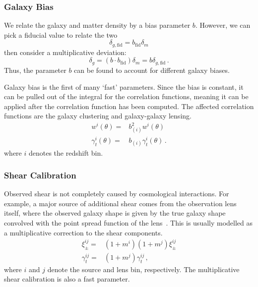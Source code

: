 \subsubsection{Galaxy Bias}
We relate the galaxy and matter density by a bias parameter $b$. However, we can pick a fiducial value to relate the two
\begin{equation}
	\delta_{g,\text{fid}} = b_{\text{fid}}\delta_m
\end{equation}
then consider a multiplicative deviation:
\begin{equation}
	\delta_g = (b\cdot b_{\text{fid}})\delta_m = b\delta_{g,\text{fid}}\,.
\end{equation}
Thus, the parameter $b$ can be found to account for different galaxy biases. 

Galaxy bias is the first of many `fast' parameters. Since the bias is constant, it can be pulled out of the integral for the correlation functions, meaning it can be applied after the correlation function has been computed. The affected correlation functions are the galaxy clustering and galaxy-galaxy lensing.
\begin{equation}
	\begin{split}
		w^i(\theta) =& b_{(i)}^2w^i(\theta) \\
		\gamma^i_t(\theta) =& b_{(i)}\gamma_t^i(\theta)\,.
	\end{split}
\end{equation}
where $i$ denotes the redshift bin.
\subsubsection{Shear Calibration}
Observed shear is not completely caused by cosmological interactions. For example, a major source of additional shear comes from the observation lens itself, where the observed galaxy shape is given by the true galaxy shape convolved with the point spread function of the lens~\cite{hirata_shear_2003,gillis_effects_2019}. This is usually modelled as a multiplicative correction to the shear components.
\begin{equation}
	\begin{split}
		\xi^{ij}_{\pm} =& (1+m^i)(1+m^j) \xi^{ij}_{\pm} \\
		\gamma^{ij}_t =& (1+m^j) \gamma_t^{ij}\,,
	\end{split}
\end{equation}
where $i$ and $j$ denote the source and lens bin, respectively. The multiplicative shear calibration is also a fast parameter.
